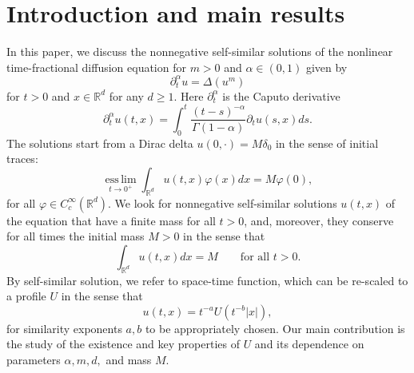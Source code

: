\documentclass[a4paper]{article}
\theoremstyle{definition}
\newcommand{\Rd}{{\mathbb{R}^d}}
\begin{document}
\section{Introduction and main results}
In this paper, we discuss the nonnegative self-similar solutions of the nonlinear time-fractional diffusion equation for $m > 0$ and $\alpha \in (0,1)$ given by
\begin{equation}
  \label{eq:main}
  \partial_t^\alpha u = \Delta (u^{m})
\end{equation}
for $t > 0$ and $x \in \mathbb R^d$ for any $d \ge 1$.
Here $\partial_t^\alpha$ is the Caputo derivative
\begin{equation}
\label{eq:Caputo}
  \partial_t^\alpha u(t,x) = \int_0^t \frac{(t-s)^{-\alpha}}{\Gamma(1-\alpha)} \partial_t u(s,x) ds.
\end{equation}
The solutions start from a Dirac delta $u(0,\cdot) = M \delta_0$ in the sense of initial traces:
\begin{equation}
  \label{eq:initial Dirac}
  \operatorname*{ess\,lim}_{t \to 0^+} \int_{\Rd} u(t,x) \varphi(x) dx = M\varphi(0),
\end{equation}
for all $\varphi \in C^\infty_c (\Rd)$. We look for nonnegative self-similar solutions $u(t,x)$ of the equation that have a finite mass for all $t>0$, and, moreover, they conserve for all times the initial mass $M>0$ in the sense that
\begin{equation}
  \label{eq:mass conservation}
  \int_{\mathbb R^d} u(t,x) dx = M \qquad \text{for all } t > 0.
\end{equation}
By self-similar solution, we refer to space-time function, which can be re-scaled to a profile $U$ in the sense that
\begin{equation}\label{eq:ssf}
  u(t,x) = t^{-a} U(t^{-b} |x|),
\end{equation}
for similarity exponents $a,b$ to be appropriately chosen.
Our main contribution is the study of the existence and key properties of $U$ and its dependence on parameters $\alpha,m,d,$ and mass $M$.

\medskip
\end{document}
